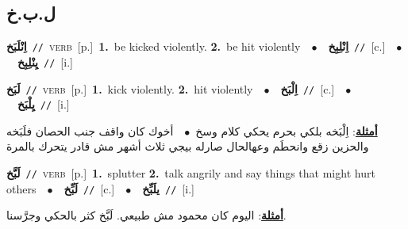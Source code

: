 \documentclass[10pt,a4paper,twoside]{article} %
\begin{document}
\begin{multicols}{2}
\vspace{-3mm}
\subsection*{\color{blue}\foreignlanguage{arabic}{ل.ب.خ}\color{blue}{}} 

{\setlength\topsep{0pt}\textbf{\foreignlanguage{arabic}{اِنْلَبَخ}}\ {\color{gray}\texttt{//}\color{black}}\ \textsc{verb}\ [p.]\ \textbf{1.}~be kicked violently.  \textbf{2.}~be hit violently\ \ $\bullet$\ \ \setlength\topsep{0pt}\textbf{\foreignlanguage{arabic}{اِنْلِبِخ}}\ {\color{gray}\texttt{//}\color{black}}\ [c.]\ \ $\bullet$\ \ \setlength\topsep{0pt}\textbf{\foreignlanguage{arabic}{يِنْلِبِخ}}\ {\color{gray}\texttt{//}\color{black}}\ [i.]\ } \vspace{2mm}

{\setlength\topsep{0pt}\textbf{\foreignlanguage{arabic}{لَبَخ}}\ {\color{gray}\texttt{//}\color{black}}\ \textsc{verb}\ [p.]\ \textbf{1.}~kick violently.  \textbf{2.}~hit violently\ \ $\bullet$\ \ \setlength\topsep{0pt}\textbf{\foreignlanguage{arabic}{اِلْبَخ}}\ {\color{gray}\texttt{//}\color{black}}\ [c.]\ \ $\bullet$\ \ \setlength\topsep{0pt}\textbf{\foreignlanguage{arabic}{يِلْبَخ}}\ {\color{gray}\texttt{//}\color{black}}\ [i.]\  \begin{flushright}\color{gray}\foreignlanguage{arabic}{\textbf{\underline{\foreignlanguage{arabic}{أمثلة}}}: اِلْبَخه بلكي بحرم يحكي كلام وسخ\ $\bullet$\ \  أخوك كان واقف جنب الحصان فلَبَخه والحزين زقع وانحطَم وعهالحال صارله بيجي ثلاث أشهر مش قادر يتحرك بالمرة}\end{flushright}\color{black}} \vspace{2mm}

{\setlength\topsep{0pt}\textbf{\foreignlanguage{arabic}{لَبَّخ}}\ {\color{gray}\texttt{//}\color{black}}\ \textsc{verb}\ [p.]\ \textbf{1.}~splutter  \textbf{2.}~talk angrily and say things that might hurt others\ \ $\bullet$\ \ \setlength\topsep{0pt}\textbf{\foreignlanguage{arabic}{لَبِّخ}}\ {\color{gray}\texttt{//}\color{black}}\ [c.]\ \ $\bullet$\ \ \setlength\topsep{0pt}\textbf{\foreignlanguage{arabic}{يلَبِّخ}}\ {\color{gray}\texttt{//}\color{black}}\ [i.]\  \begin{flushright}\color{gray}\foreignlanguage{arabic}{\textbf{\underline{\foreignlanguage{arabic}{أمثلة}}}: اليوم كان محمود مش طبيعي. لَبَّخ كثر بالحكي وجرَّسنا.}\end{flushright}\color{black}} \vspace{2mm}


\end{multicols}
\end{document}
